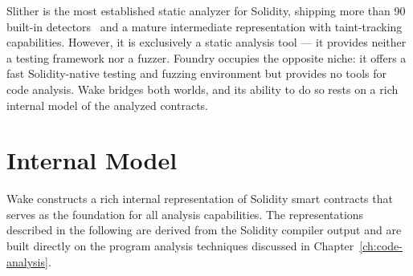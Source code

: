 \begin{table}[ht]
\centering
\renewcommand{\arraystretch}{1.4}
\caption[Comparison of frameworks.]{Comparison of security and development frameworks.}
\label{tab:framework-comparison}
\end{table}

Slither is the most established static analyzer for Solidity, shipping more than 90 built-in detectors~\cite{feist2019slither} and a mature intermediate representation with taint-tracking capabilities. However, it is exclusively a static analysis tool --- it provides neither a testing framework nor a fuzzer. Foundry occupies the opposite niche: it offers a fast Solidity-native testing and fuzzing environment but provides no tools for code analysis. Wake bridges both worlds, and its ability to do so rests on a rich internal model of the analyzed contracts.

\section{Internal Model}
\label{sec:wake-internal-model}

Wake constructs a rich internal representation of Solidity smart contracts that serves as the foundation for all analysis capabilities. The representations described in the following are derived from the Solidity compiler output and are built directly on the program analysis techniques discussed in Chapter~\ref{ch:code-analysis}.

